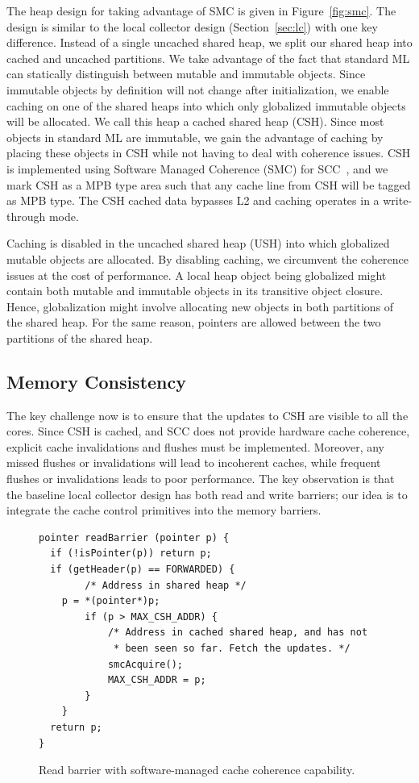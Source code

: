 The heap design for taking advantage of SMC is given in Figure~\ref{fig:smc}.
The design is similar to the local collector design (Section~\ref{sec:lc}) with
one key difference.  Instead of a single uncached shared heap, we split our
shared heap into cached and uncached partitions. We take advantage of the fact
that standard ML can statically distinguish between mutable and immutable
objects. Since immutable objects by definition will not change after
initialization, we enable caching on one of the shared heaps into which only
globalized immutable objects will be allocated. We call this heap a cached
shared heap (CSH). Since most objects in standard ML are immutable, we gain the
advantage of caching by placing these objects in CSH while not having to deal
with coherence issues. CSH is implemented using Software Managed Coherence
(SMC) for SCC~\cite{SMC}, and we mark CSH as a MPB type area such that any
cache line from CSH will be tagged as MPB type. The CSH cached data bypasses L2
and caching operates in a write-through mode.

Caching is disabled in the uncached shared heap (USH) into which globalized
mutable objects are allocated. By disabling caching, we circumvent the
coherence issues at the cost of performance. A local heap object being
globalized might contain both mutable and immutable objects in its transitive
object closure. Hence, globalization might involve allocating new objects in
both partitions of the shared heap. For the same reason, pointers are allowed
between the two partitions of the shared heap.

\subsection{Memory Consistency}

The key challenge now is to ensure that the updates to CSH are visible to all
the cores. Since CSH is cached, and SCC does not provide hardware cache
coherence, explicit cache invalidations and flushes must be implemented.
Moreover, any missed flushes or invalidations will lead to incoherent caches,
while frequent flushes or invalidations leads to poor performance. The key
observation is that the baseline local collector design has both read and write
barriers; our idea is to integrate the cache control primitives into the memory
barriers.

\begin{figure}[t]
\begin{lstlisting}
pointer readBarrier (pointer p) {
  if (!isPointer(p)) return p;
  if (getHeader(p) == FORWARDED) {
		/* Address in shared heap */
    p = *(pointer*)p;
		if (p > MAX_CSH_ADDR) {
			/* Address in cached shared heap, and has not
			 * been seen so far. Fetch the updates. */
			smcAcquire();
			MAX_CSH_ADDR = p;
		}
	}
  return p;
}
\end{lstlisting}
\caption{Read barrier with software-managed cache coherence capability.}
\label{code:read_barrier_smc}
\end{figure}

